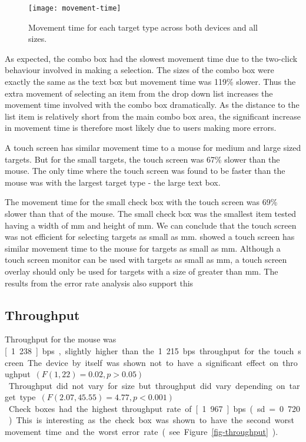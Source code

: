 \documentclass{elsart}
\begin{document}
\begin{figure}
	\centering
	\texttt{[image: movement-time]}
	\caption{Movement time for each target type across both devices and
	all sizes.}
	\label{fig-movement-time}
\end{figure}

As expected, the combo box had the slowest movement time due to the
two-click behaviour involved in making a selection. The sizes of the
combo box were exactly the same as the text box but movement time was
119\% slower. Thus the extra movement of selecting an item from the drop
down list increases the movement time involved with the combo box
dramatically. As the distance to the list item is relatively short from
the main combo box area, the significant increase in movement time is
therefore most likely due to users making more errors.

A touch screen has similar movement time to a mouse for medium and large
sized targets. But for the small targets, the touch screen was 67\%
slower than the mouse. The only time where the touch screen was found to
be faster than the mouse was with the largest target type - the large
text box.

The movement time for the small check box with the touch screen was 69\%
slower than that of the mouse. The small check box was the smallest item
tested having a width of \unit[4]{mm} and height of \unit[4]{mm}. We can
conclude that the touch screen was not efficient for selecting targets
as small as \unit[4]{mm}. \citet{Sear-A-1991-IJMMS} showed a touch
screen has similar movement time to the mouse for targets as small as
\unit[2]{mm}. Although a touch screen monitor can be used with targets
as small as \unit[2]{mm}, a touch screen overlay should only be used for
targets with a size of greater than \unit[4]{mm}. The results from the
error rate analysis also support this

\subsection{Throughput}
\label{sec-results-throughput}

Throughput for the mouse was \unit[1.238]{bps}, slightly higher than the
1.215 bps throughput for the touch screen. The device by itself was
shown not to have a significant effect on throughput \((F(1, 22) = 0.02,
p > 0.05)\). Throughput did not vary for size but throughput did vary
depending on target type \((F(2.07, 45.55) = 4.77, p < 0.001)\). Check
boxes had the highest throughput rate of \unit[1.967]{bps} (sd = 0.720).
This is interesting as the check box was shown to have the second worst
movement time and the worst error rate (see
Figure~\ref{fig-throughput}).
\end{document}
